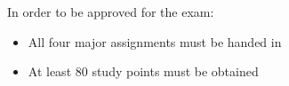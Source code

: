 In order to be approved for the exam:
\begin{itemize}
	\item All four major assignments must be handed in
	\item At least 80 study points must be obtained
\end{itemize}
